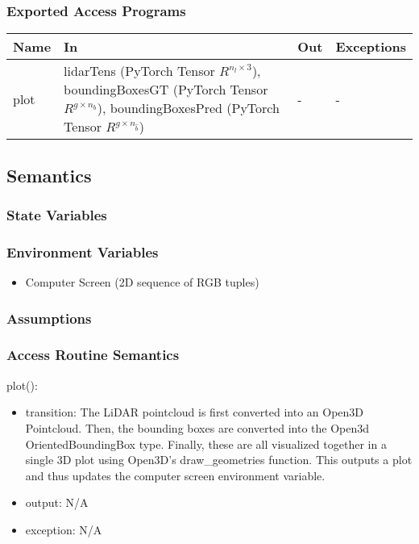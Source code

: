 \documentclass[12pt, titlepage]{article}
\begin{document}
\subsubsection{Exported Access Programs}

\begin{center}
\begin{tabular}{p{2cm}|p{6cm}|p{2cm}|p{2cm}}
\hline
\textbf{Name} & \textbf{In} & \textbf{Out} & \textbf{Exceptions} \\
\hline
plot & lidarTens (PyTorch Tensor $R^{n_{l}\times{}3}$), boundingBoxesGT (PyTorch Tensor $R^{g\times{}n_{b}}$), boundingBoxesPred (PyTorch Tensor $R^{g\times{}n_{\hat{b}}}$) & - & - \\
\hline
\end{tabular}
\end{center}

\subsection{Semantics}

\subsubsection{State Variables}

\subsubsection{Environment Variables}

\begin{itemize}
  \item Computer Screen (2D sequence of RGB tuples)
\end{itemize}

\subsubsection{Assumptions}



\subsubsection{Access Routine Semantics}
\noindent plot():
\begin{itemize}
\item transition: The LiDAR pointcloud is first converted into an Open3D Pointcloud. Then, the bounding boxes are converted into the Open3d OrientedBoundingBox type. Finally, these are all visualized together in a single 3D plot using Open3D's draw\_geometries function. This outputs a plot and thus updates the computer screen environment variable.
\item output: N/A
\item exception: N/A
\end{itemize}
\end{document}
